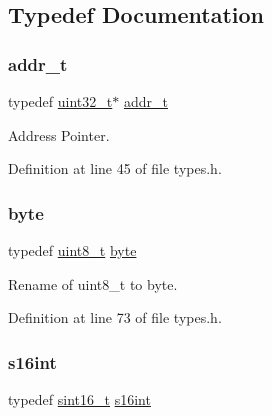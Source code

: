 \subsection{Typedef Documentation}
\mbox{\label{a00125_a295f71165288684c38c6bb836fbb3c59_a295f71165288684c38c6bb836fbb3c59}} 
\subsubsection{\texorpdfstring{addr\+\_\+t}{addr\_t}}
{\footnotesize\ttfamily typedef \hyperlink{a00125_a435d1572bf3f880d55459d9805097f62_a435d1572bf3f880d55459d9805097f62}{uint32\+\_\+t}$\ast$ \hyperlink{a00125_a295f71165288684c38c6bb836fbb3c59_a295f71165288684c38c6bb836fbb3c59}{addr\+\_\+t}}



Address Pointer. 



Definition at line 45 of file types.\+h.

\mbox{\label{a00125_ab8ef12fab634c171394422d0ee8baf94_ab8ef12fab634c171394422d0ee8baf94}} 
\subsubsection{\texorpdfstring{byte}{byte}}
{\footnotesize\ttfamily typedef \hyperlink{a00125_aba7bc1797add20fe3efdf37ced1182c5_aba7bc1797add20fe3efdf37ced1182c5}{uint8\+\_\+t} \hyperlink{a00125_ab8ef12fab634c171394422d0ee8baf94_ab8ef12fab634c171394422d0ee8baf94}{byte}}



Rename of uint8\+\_\+t to byte. 



Definition at line 73 of file types.\+h.

\mbox{\label{a00125_aec3378c6eece6833fe2ad4a8eb49ef61_aec3378c6eece6833fe2ad4a8eb49ef61}} 
\subsubsection{\texorpdfstring{s16int}{s16int}}
{\footnotesize\ttfamily typedef \hyperlink{a00125_a5881659ed80e940350d12831204375cd_a5881659ed80e940350d12831204375cd}{sint16\+\_\+t} \hyperlink{a00125_aec3378c6eece6833fe2ad4a8eb49ef61_aec3378c6eece6833fe2ad4a8eb49ef61}{s16int}}



